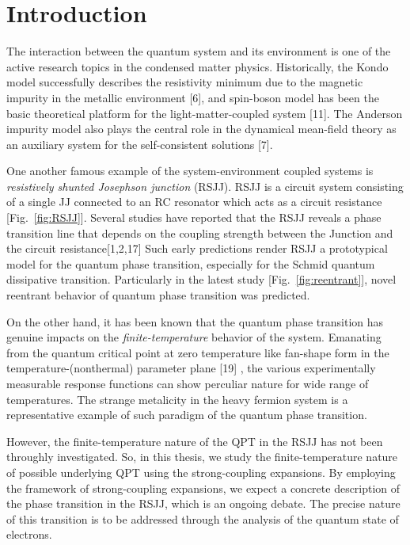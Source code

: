 \documentclass{article}[12pt]
\numberwithin{equation}{section}
\begin{document}
\section{Introduction}
\begin{spacing}{1.5}
The interaction between the quantum system and its environment is one of the active research topics in the condensed matter physics.
Historically, the Kondo model successfully describes the resistivity minimum due to the magnetic impurity in the metallic environment [6], 
and spin-boson model has been the basic theoretical platform for the light-matter-coupled system [11].
The Anderson impurity model also plays the central role in the dynamical mean-field theory as an auxiliary system for the self-consistent solutions [7].

One another famous example of the system-environment coupled systems is \textit{resistively shunted Josephson junction} (RSJJ).
RSJJ is a circuit system consisting of a single JJ connected to an RC resonator which acts as a circuit resistance [Fig.~\ref{fig:RSJJ}]. 
Several studies have reported that the RSJJ reveals a phase transition line that depends on the coupling strength between the Junction and the circuit resistance[1,2,17] 
Such early predictions render RSJJ a prototypical model for the quantum phase transition, especially for the Schmid quantum dissipative transition.
Particularly in the latest study [Fig.~\ref{fig:reentrant}], novel reentrant behavior of quantum phase transition was predicted.

On the other hand, it has been known that the quantum phase transition has genuine impacts on the \textit{finite-temperature} behavior of the system.
Emanating from the quantum critical point at zero temperature like fan-shape form in the temperature-(nonthermal) parameter plane [19]
, the various experimentally measurable response functions can show perculiar nature for wide range of temperatures.
The strange metalicity in the heavy fermion system is a representative example of such paradigm of the quantum phase transition.

However, the finite-temperature nature of the QPT in the RSJJ has not been throughly investigated.
So, in this thesis, we study the finite-temperature nature of possible underlying QPT using the strong-coupling expansions.
By employing the framework of strong-coupling expansions, we expect a concrete description of the phase transition in the RSJJ, which is an ongoing debate. 
The precise nature of this transition is to be addressed through the analysis of the quantum state of electrons.


\end{spacing}
\end{document}
